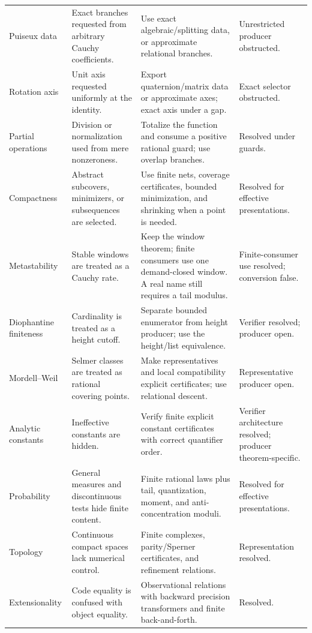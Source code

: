 \begin{longtable}{@{}>{\raggedright\arraybackslash}p{}>{\raggedright\arraybackslash}p{}>{\raggedright\arraybackslash}p{}>{\raggedright\arraybackslash}p{}@{}}
\addlinespace
Puiseux data & Exact branches requested from arbitrary Cauchy coefficients. &
Use exact algebraic/splitting data, or approximate relational branches. &
Unrestricted producer obstructed.\\
\addlinespace
Rotation axis & Unit axis requested uniformly at the identity. & Export
quaternion/matrix data or approximate axes; exact axis under a gap. & Exact
selector obstructed.\\
\addlinespace
Partial operations & Division or normalization used from mere nonzeroness. &
Totalize the function and consume a positive rational guard; use overlap
branches. & Resolved under guards.\\
\addlinespace
Compactness & Abstract subcovers, minimizers, or subsequences are selected. &
Use finite nets, coverage certificates, bounded minimization, and shrinking
when a point is needed. & Resolved for effective presentations.\\
\addlinespace
Metastability & Stable windows are treated as a Cauchy rate. & Keep the window
theorem; finite consumers use one demand-closed window.  A real name still
requires a tail modulus. & Finite-consumer use resolved; conversion false.\\
\addlinespace
Diophantine finiteness & Cardinality is treated as a height cutoff. & Separate
bounded enumerator from height producer; use the height/list equivalence. &
Verifier resolved; producer open.\\
\addlinespace
Mordell--Weil & Selmer classes are treated as rational covering points. & Make
representatives and local compatibility explicit certificates; use relational
descent. & Representative producer open.\\
\addlinespace
Analytic constants & Ineffective constants are hidden. & Verify finite explicit
constant certificates with correct quantifier order. & Verifier architecture
resolved; producer theorem-specific.\\
\addlinespace
Probability & General measures and discontinuous tests hide finite content. &
Finite rational laws plus tail, quantization, moment, and anti-concentration
moduli. & Resolved for effective presentations.\\
\addlinespace
Topology & Continuous compact spaces lack numerical control. & Finite complexes,
parity/Sperner certificates, and refinement relations. & Representation
resolved.\\
\addlinespace
Exten\-sionality & Code equality is confused with object equality. & Observational
relations with backward precision transformers and finite back-and-forth. &
Resolved.\\
\bottomrule
\end{longtable}

